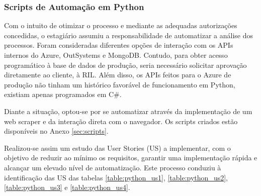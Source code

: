         \subsubsection{Scripts de Automação em Python}\label{secsec:scriptspython}

            Com o intuito de otimizar o processo e mediante as adequadas autorizações concedidas, o estagiário assumiu a responsabilidade de automatizar a análise dos processos. Foram consideradas diferentes opções de interação com os APIs internos do Azure, OutSystems e MongoDB. Contudo, para obter acesso programático à base de dados de produção, seria necessário solicitar aprovação diretamente ao cliente, à RIL. Além disso, os APIs feitos para o Azure de produção não tinham um histórico favorável de funcionamento em Python, existiam apenas programados em C\#.

            Diante a situação, optou-se por se automatizar através da implementação de um web scraper e da interação direta com o navegador. Os scripts criados estão disponíveis no Anexo \ref{sec:scripts}.

            \label{secsecsec:us_python}

                Realizou-se assim um estudo das User Stories (US) a implementar, com o objetivo de reduzir ao mínimo os requisitos, garantir uma implementação rápida e alcançar um elevado nível de automatização. Este processo conduziu à identificação das US das tabelas \ref{table:python_us1}, \ref{table:python_us2}, \ref{table:python_us3} e \ref{table:python_us4}.

